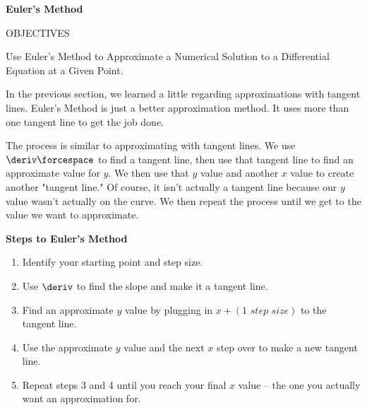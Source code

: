 \bigskip

\textbf{\large{Euler's Method}} \par

\begin{tcolorbox}[objective]
    \begin{center}
        OBJECTIVES \\[11pt]
    \end{center}
    Use Euler's Method to Approximate a Numerical Solution to a Differential
    Equation at a Given Point. 
\end{tcolorbox}

In the previous section, we learned a little regarding approximations with tangent lines. Euler's Method is just a better approximation method. It uses more than one tangent line to get the job done. \par

The process is similar to approximating with tangent lines. We use $\deriv \forcespace$ to find a tangent line, then use that tangent line to find an approximate value for $y$. We then use that $y$ value and another $x$ value to create another "tangent line." Of course, it isn't actually a tangent line because our $y$ value wasn't actually on the curve. We then repeat the process until we get to the value we want to approximate. \par

\textbf{Steps to Euler's Method}

\begin{enumerate}
    \item Identify your starting point and step size.
    \item Use $\deriv$ to find the slope and make it a tangent line. 
    \item Find an approximate $y$ value by plugging in $x + (\textit{1 step size})$ to the tangent line.
    \item Use the approximate $y$ value and the next $x$ step over to make a new tangent line.
    \item Repeat steps 3 and 4 until you reach your final $x$ value -- the one you actually want an approximation for.
\end{enumerate}

